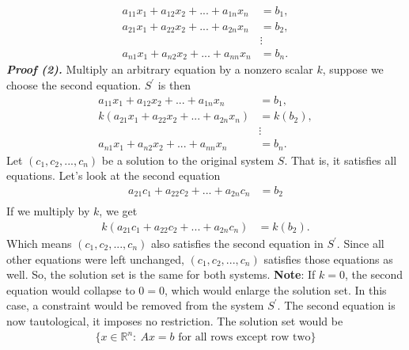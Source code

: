 \documentclass{report}
\begin{document}
\begin{itemize}
\begin{align*}
                a_{11}x_{1} + a_{12}x_{2} + ... + a_{1n}x_{n} &= b_{1},\\
                a_{21}x_{1} + a_{22}x_{2} + ... + a_{2n}x_{n} &= b_{2},\\
                                                              &\vdots\\
                a_{n1}x_{1} + a_{n2}x_{2} +  ... + a_{nn}x_{n} &= b_{n}
            .\end{align*}
            \bigbreak \noindent 
            \textbf{\textit{Proof (2).}} Multiply an arbitrary equation by a nonzero scalar $k$, suppose we choose the second equation. $S^{\prime}$ is then
             \begin{align*}
                a_{11}x_{1} + a_{12}x_{2} + ... + a_{1n}x_{n} &= b_{1},\\
                k(a_{21}x_{1} + a_{22}x_{2} + ... + a_{2n}x_{n}) &= k(b_{2}),\\
                                                              &\vdots\\
                a_{n1}x_{1} + a_{n2}x_{2} +  ... + a_{nn}x_{n} &= b_{n}
            .\end{align*}
            Let $(c_{1}, c_{2},...,c_{n})$ be a solution to the original system $S$. That is, it satisfies all equations. Let's look at the second equation
            \begin{align*}
                a_{21}c_{1} + a_{22}c_{2} + ... + a_{2n}c_{n} &= b_{2}\\
            \end{align*}
            If we multiply by $k$, we get
            \begin{align*}
                k(a_{21}c_{1} + a_{22}c_{2} + ... + a_{2n}c_{n}) &= k(b_{2})
            .\end{align*}
            Which means $(c_{1}, c_{2}, ..., c_{n}) $ also satisfies the second equation in $S^{\prime}$. Since all other equations were left unchanged, $(c_{1}, c_{2},...,c_{n}) $ satisfies those equations as well. So, the solution set is the same for both systems.
            \bigbreak \noindent 
            \textbf{Note}: If $k=0$, the second equation would collapse to $0=0$, which would enlarge the solution set. In this case, a constraint would be removed from the  system $S^{\prime}$. The second equation is now tautological, it imposes no restriction. The solution set would be
            \begin{align*}
                \{x\in \mathbb{R}^{n}:\ Ax = b \text{ for all rows except row two}\}

\end{align*}
\end{itemize}
\end{document}
